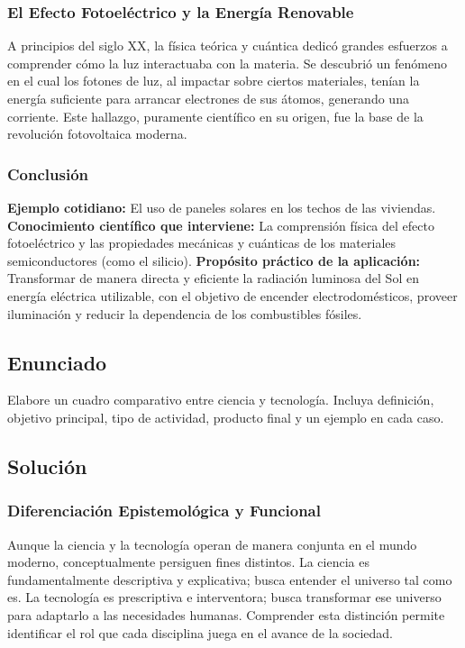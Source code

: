 \documentclass[12pt, a4paper]{article}
\begin{document}
\subsubsection*{El Efecto Fotoeléctrico y la Energía Renovable}
A principios del siglo XX, la física teórica y cuántica dedicó grandes esfuerzos a comprender cómo la luz interactuaba con la materia. Se descubrió un fenómeno en el cual los fotones de luz, al impactar sobre ciertos materiales, tenían la energía suficiente para arrancar electrones de sus átomos, generando una corriente. Este hallazgo, puramente científico en su origen, fue la base de la revolución fotovoltaica moderna.

\subsubsection*{Conclusión}
\textbf{Ejemplo cotidiano:} El uso de paneles solares en los techos de las viviendas.
\newline\newline
\textbf{Conocimiento científico que interviene:} La comprensión física del efecto fotoeléctrico y las propiedades mecánicas y cuánticas de los materiales semiconductores (como el silicio).
\newline\newline
\textbf{Propósito práctico de la aplicación:} Transformar de manera directa y eficiente la radiación luminosa del Sol en energía eléctrica utilizable, con el objetivo de encender electrodomésticos, proveer iluminación y reducir la dependencia de los combustibles fósiles.

\newpage

\subsection*{Enunciado}
Elabore un cuadro comparativo entre ciencia y tecnología. Incluya definición, objetivo principal, tipo de actividad, producto final y un ejemplo en cada caso.

\subsection*{Solución}

\subsubsection*{Diferenciación Epistemológica y Funcional}
Aunque la ciencia y la tecnología operan de manera conjunta en el mundo moderno, conceptualmente persiguen fines distintos. La ciencia es fundamentalmente descriptiva y explicativa; busca entender el universo tal como es. La tecnología es prescriptiva e interventora; busca transformar ese universo para adaptarlo a las necesidades humanas. Comprender esta distinción permite identificar el rol que cada disciplina juega en el avance de la sociedad.
\end{document}
